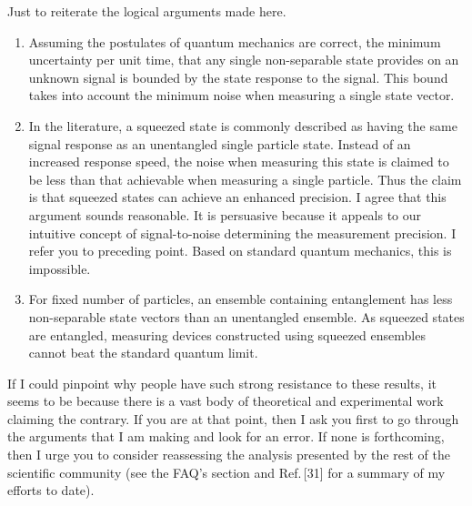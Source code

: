 \documentclass[reqno]{amsart}
\begin{document}
\noindent Just to reiterate the logical arguments made here.
\begin{enumerate}
\item Assuming the postulates of quantum mechanics are correct, the minimum uncertainty per unit time, that any single non-separable state provides on an unknown signal is bounded by the state response to the signal. This bound takes into account the minimum noise when measuring a single state vector.
\item In the literature, a squeezed state is commonly described as having the same signal response as an unentangled single particle state. Instead of an increased response speed, the noise when measuring this state is claimed to be less than that achievable when measuring a single particle. Thus the claim is that squeezed states can achieve an enhanced precision. I agree that this argument sounds reasonable. It is persuasive because it appeals to our intuitive concept of signal-to-noise determining the measurement precision. I refer you to preceding point. Based on standard quantum mechanics, this is impossible.
\item For fixed number of particles, an ensemble containing entanglement has less non-separable state vectors than an unentangled ensemble. As squeezed states are entangled, measuring devices constructed using squeezed ensembles cannot beat the standard quantum limit.\\
\end{enumerate}

If I could pinpoint why people have such strong resistance to these results, it seems to be because there is a vast body of theoretical and experimental work claiming the contrary. If you are at that point, then I ask you first to go through the arguments that I am making and look for an error. If none is forthcoming, then I urge you to consider reassessing the analysis presented by the rest of the scientific community (see the FAQ's section and Ref.\,[\textcolor{blue!50!black}{31}] for a summary of my efforts to date).
\end{document}
